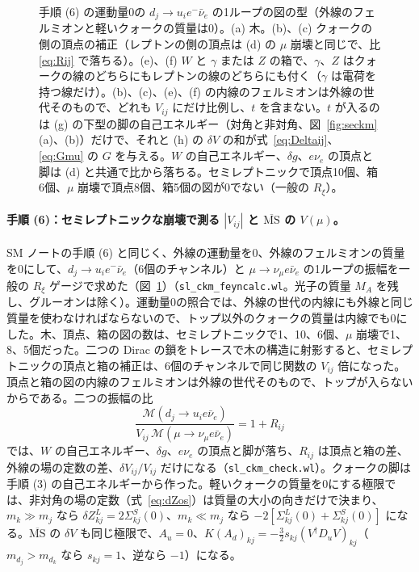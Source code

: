 \documentclass[a4paper,10pt]{ltjsarticle}
\newcommand{\MSbar}{\overline{\mathrm{MS}}}
\begin{document}
\begin{figure}[tbp]
\caption{手順 (6) の運動量0の $d_j\to u_ie^-\bar\nu_e$ の1ループの図の型（外線のフェルミオンと軽いクォークの質量は0）。(a) 木。(b)、(c) クォークの側の頂点の補正（レプトンの側の頂点は (d) の $\mu$ 崩壊と同じで、比 \eqref{eq:Rij} で落ちる）。(e)、(f) $W$ と $\gamma$ または $Z$ の箱で、$\gamma$、$Z$ はクォークの線のどちらにもレプトンの線のどちらにも付く（$\gamma$ は電荷を持つ線だけ）。(b)、(c)、(e)、(f) の内線のフェルミオンは外線の世代そのもので、どれも $V_{ij}$ にだけ比例し、$t$ を含まない。$t$ が入るのは (g) の下型の脚の自己エネルギー（対角と非対角、図~\ref{fig:seckm} (a)、(b)）だけで、それと (h) の $\delta V$ の和が式~\eqref{eq:Deltaij}、\eqref{eq:Gmu} の $G$ を与える。$W$ の自己エネルギー、$\delta g$、$e\nu_e$ の頂点と脚は (d) と共通で比から落ちる。セミレプトニックで頂点10個、箱6個、$\mu$ 崩壊で頂点8個、箱5個の図が0でない（一般の $R_\xi$）。}
\label{fig:sldiag}
\end{figure}

\paragraph{手順 (6)：セミレプトニックな崩壊で測る $|V_{ij}|$ と $\MSbar$ の $V(\mu)$。}SM ノートの手順 (6) と同じく、外線の運動量を0、外線のフェルミオンの質量を0にして、$d_j\to u_ie^-\bar\nu_e$（6個のチャンネル）と $\mu\to\nu_\mu e\bar\nu_e$ の1ループの振幅を一般の $R_\xi$ ゲージで求めた（図~\ref{fig:sldiag}）（\texttt{sl\_ckm\_feyncalc.wl}。光子の質量 $M_A$ を残し、グルーオンは除く）。運動量0の照合では、外線の世代の内線にも外線と同じ質量を使わなければならないので、トップ以外のクォークの質量は内線でも0にした。木、頂点、箱の図の数は、セミレプトニックで1、10、6個、$\mu$ 崩壊で1、8、5個だった。二つの Dirac の鎖をトレースで木の構造に射影すると、セミレプトニックの頂点と箱の補正は、6個のチャンネルで同じ関数の $V_{ij}$ 倍になった。頂点と箱の図の内線のフェルミオンは外線の世代そのもので、トップが入らないからである。二つの振幅の比
\begin{equation}
\frac{\mathcal M(d_j\to u_ie\bar\nu_e)}{V_{ij}\,\mathcal M(\mu\to\nu_\mu e\bar\nu_e)}=1+R_{ij}
\label{eq:Rij}
\end{equation}
では、$W$ の自己エネルギー、$\delta g$、$e\nu_e$ の頂点と脚が落ち、$R_{ij}$ は頂点と箱の差、外線の場の定数の差、$\delta V_{ij}/V_{ij}$ だけになる（\texttt{sl\_ckm\_check.wl}）。クォークの脚は手順 (3) の自己エネルギーから作った。軽いクォークの質量を0にする極限では、非対角の場の定数（式~\eqref{eq:dZos}）は質量の大小の向きだけで決まり、$m_k\gg m_j$ なら $\delta Z^L_{kj}=2\Sigma^S_{kj}(0)$、$m_k\ll m_j$ なら $-2[\Sigma^L_{kj}(0)+\Sigma^S_{kj}(0)]$ になる。$\MSbar$ の $\delta V$ も同じ極限で、$A_u=0$、$K(A_d)_{kj}=-\frac32s_{kj}(V^\dagger D_uV)_{kj}$（$m_{d_j}>m_{d_k}$ なら $s_{kj}=1$、逆なら $-1$）になる。
\end{document}
